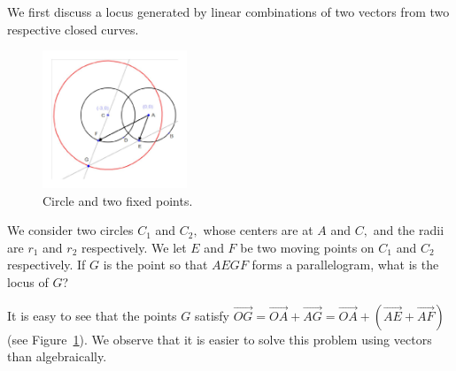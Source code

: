\documentclass[12pt,a4paper]{article}%
\begin{document}
We first discuss a locus generated by linear combinations of two vectors from
two respective closed curves.
\begin{figure}[htbp]
\begin{center}
 \includegraphics[width=1.7in,keepaspectratio]{PJH75H18.pdf}
\end{center}
 \caption{Circle and two fixed points.}
 \label{fig5}
\end{figure}

We consider two circles $C_{1}$ and $C_{2},$ whose centers are at $A$ and $C,
$ and the radii are $r_{1}$ and $r_{2}$ respectively. We let $E$ and $F$ be
two moving points on $C_{1}$ and $C_{2}$ respectively. If $G$ is the point
so that $AEGF$ forms a parallelogram, what is the locus of $G$?

It is easy to see that the points $G$ satisfy $\overrightarrow{OG}=\overrightarrow{OA}
+\overrightarrow{AG}=\overrightarrow{OA}+\left(  \overrightarrow
{AE}+\overrightarrow{AF}\right)  $ (see Figure~\ref{fig5}).
We observe that it is easier to solve this problem using vectors than
algebraically.
\end{document}
